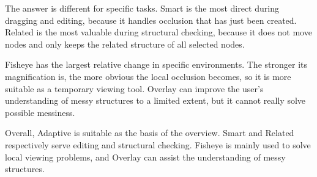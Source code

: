 The answer is different for specific tasks. Smart is the most direct during dragging and editing, because it handles occlusion that has just been created. Related is the most valuable during structural checking, because it does not move nodes and only keeps the related structure of all selected nodes.

Fisheye has the largest relative change in specific environments. The stronger its magnification is, the more obvious the local occlusion becomes, so it is more suitable as a temporary viewing tool. Overlay can improve the user's understanding of messy structures to a limited extent, but it cannot really solve possible messiness.

Overall, Adaptive is suitable as the basis of the overview. Smart and Related respectively serve editing and structural checking. Fisheye is mainly used to solve local viewing problems, and Overlay can assist the understanding of messy structures.
